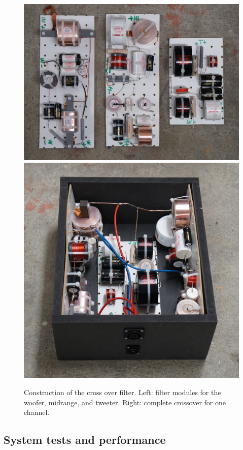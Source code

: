 \documentclass[12pt,a4paper]{article}
\providecommand{\figlabel}[1]{\label{fig:#1}}
\begin{document}
\begin{figure}[tb]
	\centering
	\includegraphics[height=0.25\textheight]{xover_modules.jpg}
	\includegraphics[height=0.25\textheight]{xover_box.jpg}
	\caption{Construction of the cross over filter. Left: filter modules for the woofer, midrange, and tweeter. Right: complete crossover for one channel.}
	\figlabel{osmc_xover_construction}
\end{figure}


\subsection{System tests and performance}
\end{document}
